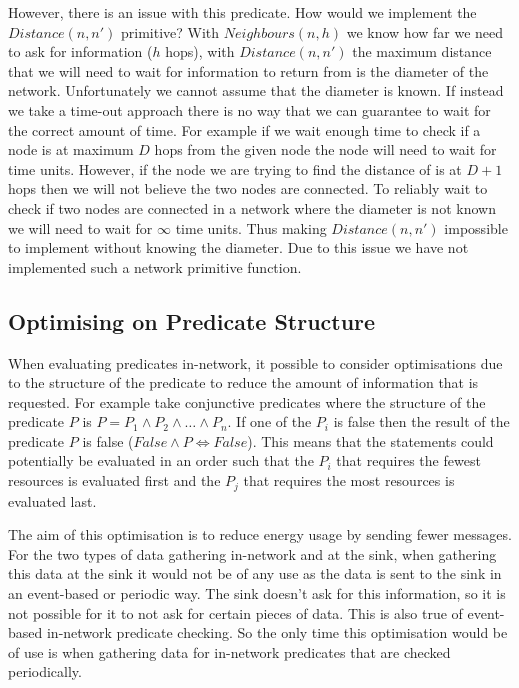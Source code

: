 However, there is an issue with this predicate. How would we implement the $Distance(n, n')$ primitive? With $Neighbours(n, h)$ we know how far we need to ask for information ($h$ hops), with $Distance(n, n')$ the maximum distance that we will need to wait for information to return from is the diameter of the network. Unfortunately we cannot assume that the diameter is known. If instead we take a time-out approach there is no way that we can guarantee to wait for the correct amount of time. For example if we wait enough time to check if a node is at maximum $D$ hops from the given node the node will need to wait for  time units. However, if the node we are trying to find the distance of is at $D + 1 $ hops then we will not believe the two nodes are connected. To reliably wait to check if two nodes are connected in a network where the diameter is not known we will need to wait for $\infty$ time units. Thus making $Distance(n, n')$ impossible to implement without knowing the diameter. Due to this issue we have not implemented such a network primitive function.


\subsection{Optimising on Predicate Structure}



When evaluating predicates in-network, it possible to consider optimisations due to the structure of the predicate to reduce the amount of information that is requested. For example take conjunctive predicates where the structure of the predicate $P$ is $P = P_1 \land P_2 \land \ldots \land P_n$. If one of the $P_i$ is false then the result of the predicate $P$ is false ($False \land P \Leftrightarrow False$). This means that the statements could potentially be evaluated in an order such that the $P_i$ that requires the fewest resources is evaluated first and the $P_j$ that requires the most resources is evaluated last.

The aim of this optimisation is to reduce energy usage by sending fewer messages. For the two types of data gathering in-network and at the sink, when gathering this data at the sink it would not be of any use as the data is sent to the sink in an event-based or periodic way. The sink doesn't ask for this information, so it is not possible for it to not ask for certain pieces of data. This is also true of event-based in-network predicate checking. So the only time this optimisation would be of use is when gathering data for in-network predicates that are checked periodically.

